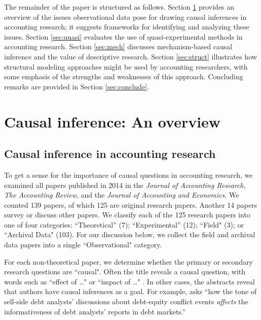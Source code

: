 \documentclass[12pt,reqno,titlepage]{amsart}
\begin{document}
\begin{doublespace}
\vskip 10pt
The remainder of the paper is structured as follows.
Section \ref{sec:causal} provides an overview of the issues observational data pose for drawing causal inferences in accounting research; 
it suggests frameworks for identifying and analyzing these issues.
Section \ref{sec:quasi} evaluates the use of quasi-experimental methods in accounting research.
Section \ref{sec:mech} discusses mechanism-based causal inference and the value of descriptive research.
Section \ref{sec:struct} illustrates how structural modeling approaches might be used by accounting researchers, with some emphasis of the strengths and weaknesses of this approach.
Concluding remarks are provided in Section \ref{sec:conclude}.

\section{Causal inference: An overview} \label{sec:causal}

\subsection{Causal inference in accounting research}

To get a sense for the importance of causal questions in accounting research,
we examined all papers published in 2014 in the \textit{Journal of Accounting Research}, \textit{The Accounting Review}, and the \textit{Journal of Accounting and Economics}.
We counted 139 papers, of which 125 are original research papers. Another 14 papers survey or discuss other papers.
We classify each of the 125 research papers into one of four categories:  ``Theoretical'' (7); ``Experimental'' (12); ``Field" (3); or ``Archival Data" (103). 
For our discussion below, we collect the field and archival data papers into a single  ``Observational" category.

For each non-theoretical paper, we determine whether the primary or secondary research questions are ``causal". 
Often the title reveals a causal question, with words such as ``effect of \dots" or ``impact of \dots" \citep[e.g.][]{Cohen:2014jl,Clorproell:2014cv}. 
In other cases, the abstracts reveal that authors have causal inferences as a goal. 
For example, \citet{deFranco:2014ct} asks ``how the tone of sell-side debt analysts' discussions about debt-equity conflict events \emph{affects} the informativeness of debt analysts' reports in debt markets.''


\end{doublespace}
\end{document}
